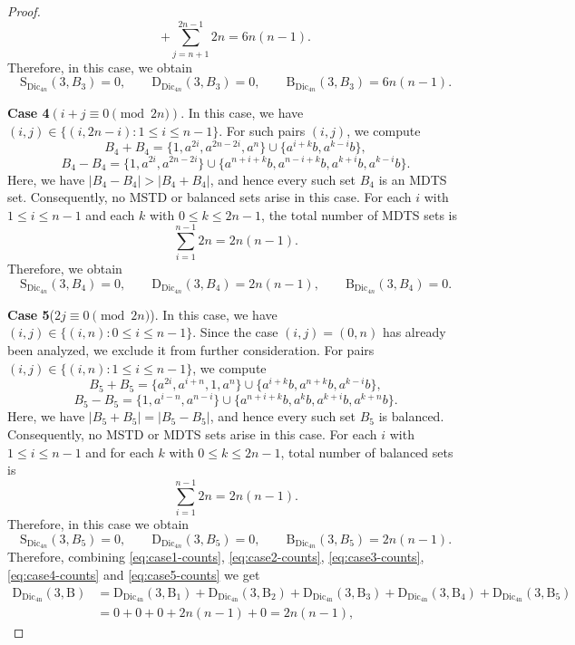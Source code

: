 \documentclass[10pt,a4paper]{amsart}
\begin{document}
\begin{proof}
$$+\sum_{j=n+1}^{2n-1}2n
=6n(n-1).
$$
Therefore, in this case, we obtain
\begin{equation}\label{eq:case3-counts}
\mathrm{S}_{\mathrm{Dic}_{4n}}(3,B_3)=0, \qquad 
\mathrm{D}_{\mathrm{Dic}_{4n}}(3,B_3)=0, \qquad 
\mathrm{B}_{\mathrm{Dic}_{4n}}(3,B_3)=6n(n-1).
\end{equation}\par
\textbf{Case 4}$(i+j\equiv 0 \pmod{2n})$. In this case, we have  $(i,j)\in \{(i,2n-i): 1\leq i\leq n-1\}$. For such pairs $(i,j)$,  we compute 
$$B_{4}+B_{4}=\{1,a^{2i},a^{2n-2i},a^n\}\cup\{a^{i+k}b,a^{k-i}b\},$$ 
$$B_{4}-B_{4}=\{1,a^{2i},a^{2n-2i}\}\cup \{a^{n+i+k}b,a^{n-i+k}b,a^{k+i}b,a^{k-i}b\}.$$
Here, we have $|B_{4}-B_{4}|>|B_{4}+B_{4}|$, and hence every such set $B_4$ is an MDTS set. Consequently, no MSTD or balanced sets arise in this case. For each $i$ with $1\le i\le n-1$ and each $k$ with $0\le k\le 2n-1$, the total number of MDTS sets is
$$
\sum_{i=1}^{n-1}2n=2n(n-1).
$$ Therefore, we obtain \begin{equation}\label{eq:case4-counts}
\mathrm{S}_{\mathrm{Dic}_{4n}}(3,B_4)=0, \qquad 
\mathrm{D}_{\mathrm{Dic}_{4n}}(3,B_4)=2n(n-1), \qquad 
\mathrm{B}_{\mathrm{Dic}_{4n}}(3,B_4)=0.
\end{equation}\par
\textbf{Case 5}($2j\equiv 0 \pmod{2n}$). In this case, we have  $(i,j)\in\{(i,n):0\leq i \leq n-1\}$. Since the case $(i,j)=(0,n)$ has already been analyzed,  we exclude it from further consideration. For pairs $(i,j)\in\{(i,n):1\leq i \leq n-1\}$, we compute
$$B_5+B_5=\{a^{2i},a^{i+n},1,a^{n}\}\cup
\{a^{i+k}b,a^{n+k}b,a^{k-i}b\},$$
$$B_5-B_5=\{1,a^{i-n},a^{n-i}\}\cup
\{a^{n+i+k}b,a^{k}b,a^{k+i}b,a^{k+n}b\}.$$
Here, we have $|B_5+B_5|=|B_5-B_5|$, and hence every such set $B_5$ is balanced. Consequently, no MSTD or MDTS sets arise in this case. For each $i$ with $1\le i\le n-1$ and for each $k$ with $0\le k\le 2n-1$,  total number of balanced sets is
$$\sum_{i=1}^{n-1}2n=2n(n-1).$$
Therefore, in this case we obtain
\begin{equation}\label{eq:case5-counts}
\mathrm{S}_{\mathrm{Dic}_{4n}}(3,B_5)=0, \qquad 
\mathrm{D}_{\mathrm{Dic}_{4n}}(3,B_5)=0, \qquad 
\mathrm{B}_{\mathrm{Dic}_{4n}}(3,B_5)=2n(n-1).
\end{equation}
Therefore, combining \eqref{eq:case1-counts}, \eqref{eq:case2-counts}, \eqref{eq:case3-counts}, \eqref{eq:case4-counts} and \eqref{eq:case5-counts} we get 
\begin{align*}
\mathrm{D_{\mathrm{Dic_{4n}}}(3,B)}&=\mathrm{D_{\mathrm{Dic_{4n}}}(3,B_1)}+\mathrm{D_{\mathrm{Dic_{4n}}}(3,B_2)}+\mathrm{D_{\mathrm{Dic_{4n}}}(3,B_3)}+\mathrm{D_{\mathrm{Dic_{4n}}}(3,B_4)}+\mathrm{D_{\mathrm{Dic_{4n}}}(3,B_5)}\\&=0+0+0+2n(n-1)+0=2n(n-1),\end{align*}

\end{proof}
\end{document}
